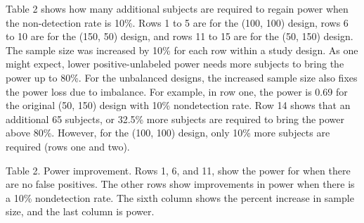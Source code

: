\documentclass[
]{article}
\begin{document}
Table 2 shows how many additional subjects are required to regain power
when the non-detection rate is 10\%. Rows 1 to 5 are for the (100, 100)
design, rows 6 to 10 are for the (150, 50) design, and rows 11 to 15 are
for the (50, 150) design. The sample size was increased by 10\% for each
row within a study design. As one might expect, lower positive-unlabeled
power needs more subjects to bring the power up to 80\%. For the
unbalanced designs, the increased sample size also fixes the power loss
due to imbalance. For example, in row one, the power is 0.69 for the
original (50, 150) design with 10\% nondetection rate. Row 14 shows that
an additional 65 subjects, or 32.5\% more subjects are required to bring
the power above 80\%. However, for the (100, 100) design, only 10\% more
subjects are required (rows one and two).

Table 2. Power improvement. Rows 1, 6, and 11, show the power for when
there are no false positives. The other rows show improvements in power
when there is a 10\% nondetection rate. The sixth column shows the
percent increase in sample size, and the last column is power.
\end{document}
